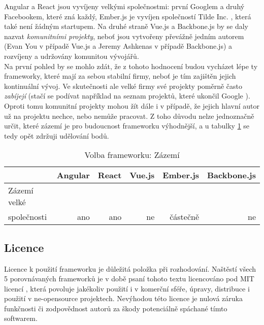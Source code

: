 Angular a React jsou vyvíjeny velkými společnostmi: první Googlem a druhý Facebookem, které zná každý, Ember.js je vyvíjen společností Tilde Inc. \cite{tilde}, která také není žádným startupem. Na druhé straně Vue.js a Backbone.js by se daly nazvat \emph{komunitními projekty}, neboť jsou vytvořeny převážně jedním autorem (Evan You v případě Vue.js a Jeremy Ashkenas v případě Backbone.js) a rozvíjeny a udržovány komunitou vývojářů. 
\\
Na první pohled by se mohlo zdát, že z tohoto hodnocení budou vycházet lépe ty frameworky, které mají za sebou stabilní firmy, neboť je tím zajištěn jejich kontinuální vývoj. Ve skutečnosti ale velké firmy své projekty poměrně často \emph{zabíjejí} (stačí se podívat například na seznam projektů, které ukončil Google \cite{killed_by_google}). Oproti tomu komunitní projekty mohou žít dále i v případě, že jejich hlavní autor už na projektu nechce, nebo nemůže pracovat. Z toho důvodu nelze jednoznačně určit, které zázemí je pro budoucnost frameworku výhodnější, a u tabulky \ref{table:compare:background} se tedy opět zdržuji udělování bodů.

\begin{table}[h]
\caption{Volba frameworku: Zázemí}
\label{table:compare:background}
\begin{tabular}{lrrrrr}
\hline
                                         & Angular                     & React                     & Vue.js                     & Ember.js                     & Backbone.js               \\ \hline
Zázemí velké\\společnosti                & ano                         & ano                       & ne                         & částečně                     & ne                        \\
\end{tabular}
\end{table}


\subsection{Licence}

Licence k použití frameworku je důležitá položka při rozhodování. Naštěstí všech 5 porovnávaných frameworků je v době psaní tohoto textu licencováno pod MIT licencí \cite{mit-license}, která povoluje jakékoliv použití i v komerční sféře, úpravy, distribuce i použití v ne-opensource projektech. Nevýhodou této licence je nulová záruka funkčnosti či zodpovědnost autorů za škody potenciálně spáchané tímto softwarem.
\\
